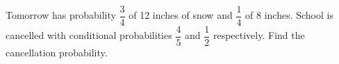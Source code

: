 Tomorrow has probability $\dfrac{3}{4}$ of 12 inches of snow and $\dfrac{1}{4}$ of 8 inches. School is cancelled with conditional probabilities $\dfrac{4}{5}$ and $\dfrac{1}{2}$ respectively. Find the cancellation probability.
